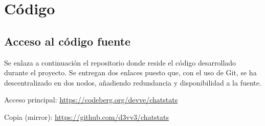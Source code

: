 \chapter{Código} \label{chap:code}

\section{Acceso al código fuente}

Se enlaza a continuación el repositorio donde reside el código desarrollado durante el proyecto. Se entregan dos enlaces puesto que, con el uso de Git, se ha descentralizado en dos nodos, añadiendo redundancia y disponibilidad a la fuente.

Acceso principal: \url{https://codeberg.org/devve/chatstats}

Copia (mirror): \url{https://github.com/d3vv3/chatstats}